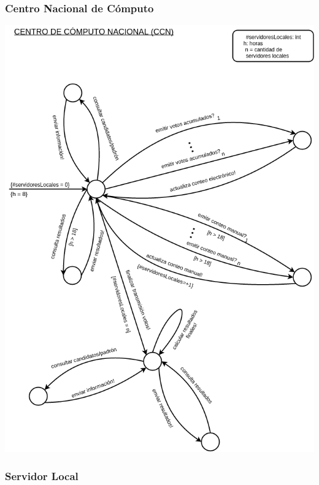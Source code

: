 \documentclass[spanish, 10pt,a4paper]{article}
\numberwithin{equation}{section} %
\begin{document}
\subsubsection{Centro Nacional de Cómputo}
\vspace{\baselineskip}
    \begin{center}
                \includegraphics[scale=0.50]{imagenes/fsm/FSMCCN.png}
                \\
                \vspace{1pt}
                \footnotesize\textit{}
        \end{center}
\vspace{\baselineskip}

\subsubsection{Servidor Local}
\end{document}
